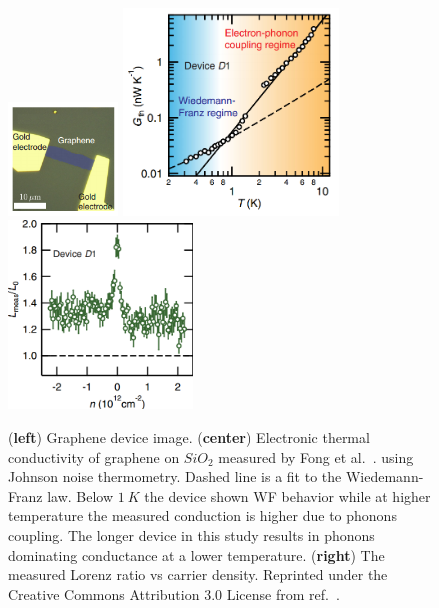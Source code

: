 \begin{figure}
\centering
\includegraphics[height=30mm, valign=t]{figures/high_density_graphene/Fong_picture.png}
\includegraphics[height=55mm, valign=t]{figures/high_density_graphene/Fong_Gth.png}
\includegraphics[height=50mm, valign=t]{figures/high_density_graphene/Fong_L.png}
\caption{(\textbf{left}) Graphene device image. (\textbf{center}) Electronic thermal conductivity of graphene on $SiO_2$ measured by Fong et al.~\cite{fong_measurement_2013}. using Johnson noise thermometry. Dashed line is a fit to the Wiedemann-Franz law. Below $1~K$ the device shown WF behavior while at higher temperature the measured conduction is higher due to phonons coupling. The longer device in this study results in phonons dominating conductance at a lower temperature. (\textbf{right}) The measured Lorenz ratio vs carrier density. Reprinted under the Creative Commons Attribution 3.0 License from ref.~\cite{fong_measurement_2013}.}
\label{fig:Fong_Gth}
\end{figure}
